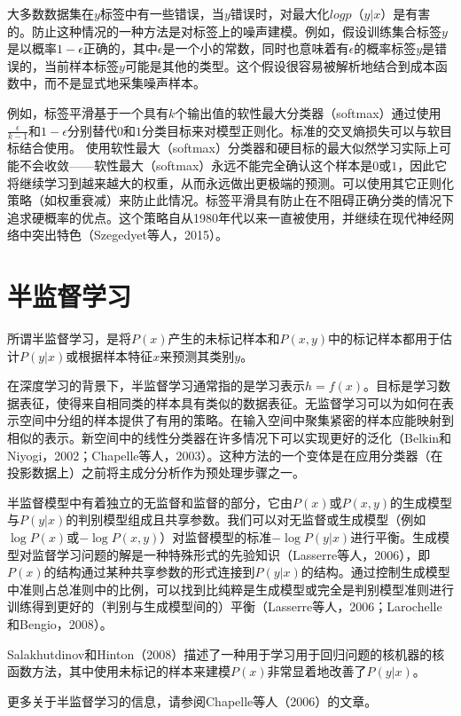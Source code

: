 大多数数据集在$y$标签中有一些错误，当$y$错误时，对最大化$log p（y | x）$是有害的。防止这种情况的一种方法是对标签上的噪声建模。例如，假设训练集合标签$y$是以概率$1-\epsilon$正确的，其中$\epsilon$是一个小的常数，同时也意味着有$\epsilon$的概率标签$y$是错误的，当前样本标签$y$可能是其他的类型。这个假设很容易被解析地结合到成本函数中，而不是显式地采集噪声样本。

例如，标签平滑基于一个具有$k$个输出值的软性最大分类器（softmax）通过使用$\frac{\epsilon}{k-1}$和$1-\epsilon$分别替代$0$和$1$分类目标来对模型正则化。标准的交叉熵损失可以与软目标结合使用。 使用软性最大（softmax）分类器和硬目标的最大似然学习实际上可能不会收敛——软性最大（softmax）永远不能完全确认这个样本是$0$或$1$，因此它将继续学习到越来越大的权重，从而永远做出更极端的预测。可以使用其它正则化策略（如权重衰减）来防止此情况。标签平滑具有防止在不阻碍正确分类的情况下追求硬概率的优点。这个策略自从1980年代以来一直被使用，并继续在现代神经网络中突出特色（Szegedyet等人，2015）。

\section{半监督学习}

所谓半监督学习，是将$P(x)$产生的未标记样本和$P(x, y)$中的标记样本都用于估计$P(y | x)$或根据样本特征$x$来预测其类别$y$。

在深度学习的背景下，半监督学习通常指的是学习表示$h = f(x)$。目标是学习数据表征，使得来自相同类的样本具有类似的数据表征。无监督学习可以为如何在表示空间中分组的样本提供了有用的策略。在输入空间中聚集紧密的样本应能映射到相似的表示。新空间中的线性分类器在许多情况下可以实现更好的泛化（Belkin和Niyogi，2002；Chapelle等人，2003）。这种方法的一个变体是在应用分类器（在投影数据上）之前将主成分分析作为预处理步骤之一。

半监督模型中有着独立的无监督和监督的部分，它由$P(x)$或$P(x,y)$的生成模型与$P(y|x)$的判别模型组成且共享参数。我们可以对无监督或生成模型（例如$\log P(x)$或$-\log P(x,y)$）对监督模型的标准$-\log P(y | x)$进行平衡。生成模型对监督学习问题的解是一种特殊形式的先验知识（Lasserre等人，2006），即$P(x)$的结构通过某种共享参数的形式连接到$P(y | x)$的结构。通过控制生成模型中准则占总准则中的比例，可以找到比纯粹是生成模型或完全是判别模型准则进行训练得到更好的（判别与生成模型间的）平衡（Lasserre等人，2006；Larochelle和Bengio，2008）。

Salakhutdinov和Hinton（2008）描述了一种用于学习用于回归问题的核机器的核函数方法，其中使用未标记的样本来建模$P(x)$非常显着地改善了$P(y | x)$。

更多关于半监督学习的信息，请参阅Chapelle等人（2006）的文章。

